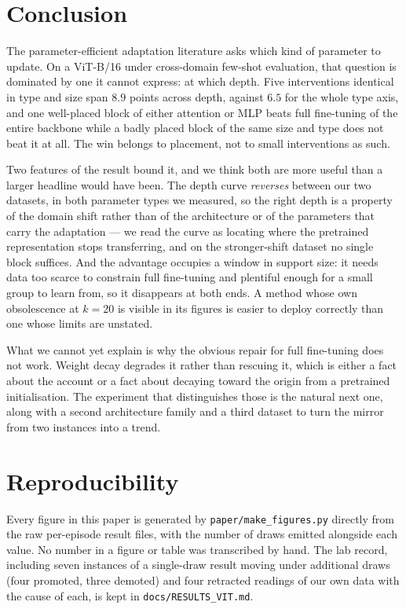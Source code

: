 \documentclass[11pt]{article}
\begin{document}
\section{Conclusion}

The parameter-efficient adaptation literature asks which kind of parameter to update.
On a ViT-B/16 under cross-domain few-shot evaluation, that question is dominated by one
it cannot express: at which depth. Five interventions identical in type and size span
$8.9$ points across depth, against $6.5$ for the whole type axis, and one well-placed
block of either attention or MLP beats full fine-tuning of the entire backbone while a
badly placed block of the same size and type does not beat it at all. The win belongs to
placement, not to small interventions as such.

Two features of the result bound it, and we think both are more useful than a larger
headline would have been. The depth curve \emph{reverses} between our two datasets, in
both parameter types we measured, so the right depth is a property of the domain shift
rather than of the architecture or of the parameters that carry the adaptation --- we
read the curve as locating where the pretrained representation stops transferring, and
on the stronger-shift dataset no single block suffices. And the advantage occupies a
window in support size: it needs data too scarce to constrain full fine-tuning and
plentiful enough for a small group to learn from, so it disappears at both ends. A
method whose own obsolescence at $k=20$ is visible in its figures is easier to deploy
correctly than one whose limits are unstated.

What we cannot yet explain is why the obvious repair for full fine-tuning does not work.
Weight decay degrades it rather than rescuing it, which is either a fact about the
account or a fact about decaying toward the origin from a pretrained initialisation. The
experiment that distinguishes those is the natural next one, along with a second
architecture family and a third dataset to turn the mirror from two instances into a
trend.

\section*{Reproducibility}

Every figure in this paper is generated by \texttt{paper/make\_figures.py} directly from
the raw per-episode result files, with the number of draws emitted alongside each value.
No number in a figure or table was transcribed by hand. The lab record, including seven
instances of a single-draw result moving under additional draws (four promoted, three
demoted) and four retracted readings of our own data with the cause of each, is kept in
\texttt{docs/RESULTS\_VIT.md}.
\end{document}
